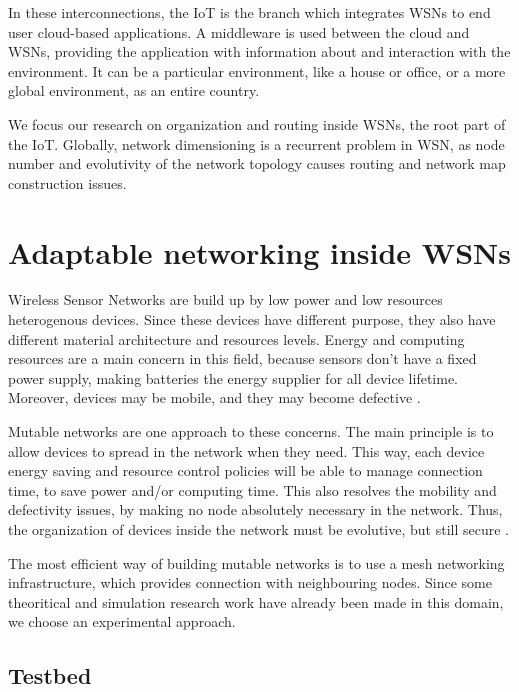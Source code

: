 \documentclass[10pt,twocolumn,letterpaper]{article}
\begin{document}
In these interconnections, the IoT is the branch which integrates WSNs to end user cloud-based applications. A middleware is used between the cloud and WSNs, providing the application with information about and interaction with the environment. It can be a particular environment, like a house or office, or a more global environment, as an entire country.


We focus our research on organization and routing inside WSNs, the root part of the IoT. Globally, network dimensioning is a recurrent problem in WSN, as node number and evolutivity of the network topology causes routing and network map construction issues. 

\section{Adaptable networking inside WSNs}

Wireless Sensor Networks are build up by low power and low resources heterogenous devices. Since these devices have different purpose, they also have different material architecture and resources levels. Energy and computing resources are a main concern in this field, because sensors don't have a fixed power supply, making batteries the energy supplier for all device lifetime. Moreover, devices may be mobile, and they may become defective \cite{Kyriazis2013}.

Mutable networks are one approach to these concerns. The main principle is to allow devices to spread in the network when they need. This way, each device energy saving and resource control policies will be able to manage connection time, to save power and/or computing time. This also resolves the mobility and defectivity issues, by making no node absolutely necessary in the network. Thus, the organization of devices inside the network must be evolutive, but still secure \cite{Kyriazis2013}.

The most efficient way of building mutable networks is to use a mesh networking infrastructure, which provides connection with neighbouring nodes. Since some theoritical and simulation research work have already been made in this domain, we choose an experimental approach. 

\vspace{-0.05cm}
\subsection{Testbed}
\end{document}
